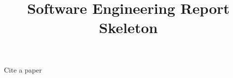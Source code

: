 \documentclass{article}
\title{Software Engineering Report Skeleton}
\begin{document}
\maketitle









\newpage
Cite a paper\cite{DBLP:conf/siggraph/BertalmioSCB00}


\end{document}
